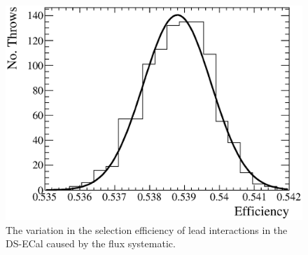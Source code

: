 \begin{figure}
  \centering
  \includegraphics[width=12cm]{images/measurement/systematics/flux/flux_efficiency_variation.eps}
  \caption{The variation in the selection efficiency of lead interactions in the DS-ECal caused by the flux systematic.}
  \label{fig:FluxEfficiencyVariation}
\end{figure}
